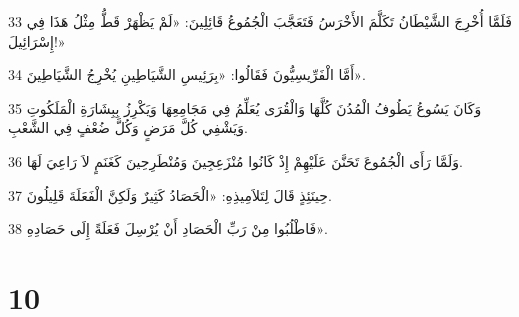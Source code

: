 \par 33 فَلَمَّا أُخْرِجَ الشَّيْطَانُ تَكَلَّمَ الأَخْرَسُ فَتَعَجَّبَ الْجُمُوعُ قَائِلِينَ: «لَمْ يَظْهَرْ قَطُّ مِثْلُ هَذَا فِي إِسْرَائِيلَ!»
\par 34 أَمَّا الْفَرِّيسِيُّونَ فَقَالُوا: «بِرَئِيسِ الشَّيَاطِينِ يُخْرِجُ الشَّيَاطِينَ».
\par 35 وَكَانَ يَسُوعُ يَطُوفُ الْمُدُنَ كُلَّهَا وَالْقُرَى يُعَلِّمُ فِي مَجَامِعِهَا وَيَكْرِزُ بِبِشَارَةِ الْمَلَكُوتِ وَيَشْفِي كُلَّ مَرَضٍ وَكُلَّ ضُعْفٍ فِي الشَّعْبِ.
\par 36 وَلَمَّا رَأَى الْجُمُوعَ تَحَنَّنَ عَلَيْهِمْ إِذْ كَانُوا مُنْزَعِجِينَ وَمُنْطَرِحِينَ كَغَنَمٍ لاَ رَاعِيَ لَهَا.
\par 37 حِينَئِذٍ قَالَ لِتَلاَمِيذِهِ: «الْحَصَادُ كَثِيرٌ وَلَكِنَّ الْفَعَلَةَ قَلِيلُونَ.
\par 38 فَاطْلُبُوا مِنْ رَبِّ الْحَصَادِ أَنْ يُرْسِلَ فَعَلَةً إِلَى حَصَادِهِ».

\chapter{10}

